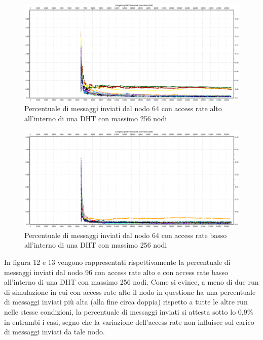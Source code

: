 \documentclass[	
	DIV=calc,
	paper=a4,
	fontsize=11pt,
	onecolumn
]{scrartcl} %
\begin{document}
	\begin{figure}[H]
		\centering
		\includegraphics[scale=0.35]	{SymphonyDHT/plots/PercentageOfMessagesSent/256_Nodes_FastAccess/SymphonyDHT_256Nodes_FastAccess_Node64.png}
		\caption{Percentuale di messaggi inviati dal nodo 64 con access rate alto all'interno di una DHT con massimo 256 nodi}
		\label{Figura 10}
	\end{figure}
	\begin{figure}[H]
		\centering
		\includegraphics[scale=0.35]	{SymphonyDHT/plots/PercentageOfMessagesSent/256_Nodes_SlowAccess/SymphonyDHT_256Nodes_SlowAccess_Node64.png}
		\caption{Percentuale di messaggi inviati dal nodo 64 con access rate basso all'interno di una DHT con massimo 256 nodi}
		\label{Figura 11}
	\end{figure}	
	
	In figura 12 e 13 vengono rappresentati rispettivamente la percentuale di messaggi inviati dal nodo 96 con access rate alto e con access rate basso all'interno di una DHT con massimo 256 nodi. Come si evince, a meno di due run di simulazione in cui con access rate alto il nodo in questione ha una percentuale di messaggi inviati più alta (alla fine circa doppia) rispetto a tutte le altre run nelle stesse condizioni, la percentuale di messaggi inviati si attesta sotto lo 0,9\% in entrambi i casi, segno che la variazione dell'access rate non influisce sul carico di messaggi inviati da tale nodo.
	
\end{document}
